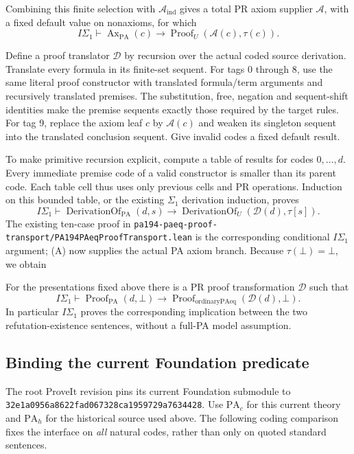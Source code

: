 Combining this finite selection with $\mathcal A_{\mathrm{ind}}$ gives
a total PR axiom supplier $\mathcal A$, with a fixed default value on
nonaxioms, for which
\[
 I\Sigma_1\vdash
 \operatorname{Ax}_{\mathrm{PA}}(c)
 \longrightarrow \operatorname{Proof}_U(\mathcal A(c),\tau(c)). \tag{A}
\]

Define a proof translator $\mathcal D$ by recursion over the actual coded
source derivation.  Translate every formula in its finite-set sequent.
For tags 0 through 8, use the same literal proof constructor with
translated formula/term arguments and recursively translated premises.
The substitution, free, negation and sequent-shift identities make the
premise sequents exactly those required by the target rules.  For tag 9,
replace the axiom leaf $c$ by $\mathcal A(c)$ and weaken its singleton
sequent into the translated conclusion sequent.  Give invalid codes a
fixed default result.

To make primitive recursion explicit, compute a table of results for
codes $0,\ldots,d$.  Every immediate premise code of a valid constructor
is smaller than its parent code.  Each table cell thus uses only previous
cells and PR operations.  Induction on this bounded table, or the
existing $\Sigma_1$ derivation induction, proves
\[
 I\Sigma_1\vdash
 \operatorname{DerivationOf}_{\mathrm{PA}}(d,s)
 \longrightarrow
 \operatorname{DerivationOf}_{U}(\mathcal D(d),\tau[s]).   \tag{D}
\]
The existing ten-case proof in
\texttt{pa194-paeq-proof-transport/PA194PAeqProofTransport.lean}
is the corresponding conditional $I\Sigma_1$ argument; (A) now supplies
the actual PA axiom branch.  Because $\tau(\bot)=\bot$, we obtain
\begin{theorem}
For the presentations fixed above there is a PR proof transformation
$\mathcal D$ such that
\[
 I\Sigma_1\vdash
 \operatorname{Proof}_{\mathrm{PA}}(d,\bot)
 \longrightarrow \operatorname{Proof}_{\mathrm{ordinaryPAeq}}(\mathcal D(d),\bot).
\]
In particular $I\Sigma_1$ proves the corresponding implication between
the two refutation-existence sentences, without a full-PA model assumption.
\end{theorem}

\subsection{Binding the current Foundation predicate}
\label{sec:current-foundation-adapter}

The root ProveIt revision pins its current Foundation submodule to
\texttt{32e1a0956a8622fad067328ca1959729a7634428}.
Use $\mathrm{PA}_c$ for this current theory and $\mathrm{PA}_h$ for the
historical source used above.  The following coding comparison fixes
the interface on \emph{all} natural codes, rather than only on quoted
standard sentences.

